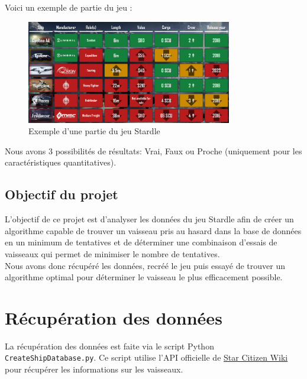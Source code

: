 \documentclass{article}
\begin{document}
Voici un exemple de partie du jeu :
\\
\begin{figure}[ht]
    \centering
    \includegraphics[width=0.8\textwidth]{stardle.png}
    \caption{Exemple d'une partie du jeu Stardle}
    \label{fig:stardle_example}
\end{figure}

Nous avons 3 possibilités de résultats: Vrai, Faux ou Proche (uniquement pour les caractéristiques quantitatives). \\ 

\subsection{Objectif du projet}

L'objectif de ce projet est d'analyser les données du jeu Stardle afin de créer un algorithme capable de trouver  un vaisseau pris au hasard dans la base de données en un minimum de tentatives et de déterminer une combinaison d'essais de vaisseaux qui permet de minimiser le nombre de tentatives.
\\
Nous avons donc récupéré les données, recréé le jeu puis essayé de trouver un 
algorithme optimal pour déterminer le vaisseau le plus efficacement possible. 

\maketitle
\section{Récupération des données}

La récupération des données est faite via le script Python \verb|CreateShipDatabase.py|.
Ce script utilise l'API officielle de \href{https://starcitizen.tools/}{Star Citizen Wiki}  pour récupérer les informations sur les vaisseaux.
\end{document}
